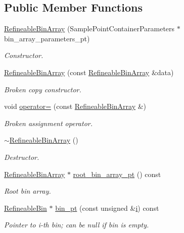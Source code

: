 \subsection*{Public Member Functions}
\begin{DoxyCompactItemize}
\item 
\hyperlink{classRefineableBinArray_ae8f20e18970ec50ea92ea975ed3b1f6e}{Refineable\+Bin\+Array} (Sample\+Point\+Container\+Parameters $\ast$bin\+\_\+array\+\_\+parameters\+\_\+pt)
\begin{DoxyCompactList}\small\item\em Constructor. \end{DoxyCompactList}\item 
\hyperlink{classRefineableBinArray_a0f9458336a724be7281174800d268073}{Refineable\+Bin\+Array} (const \hyperlink{classRefineableBinArray}{Refineable\+Bin\+Array} \&data)
\begin{DoxyCompactList}\small\item\em Broken copy constructor. \end{DoxyCompactList}\item 
void \hyperlink{classRefineableBinArray_aedf0b5374a41ba17415bee6778e07600}{operator=} (const \hyperlink{classRefineableBinArray}{Refineable\+Bin\+Array} \&)
\begin{DoxyCompactList}\small\item\em Broken assignment operator. \end{DoxyCompactList}\item 
\hyperlink{classRefineableBinArray_a0ab4375c167506d001a9522307805ab4}{$\sim$\+Refineable\+Bin\+Array} ()
\begin{DoxyCompactList}\small\item\em Destructor. \end{DoxyCompactList}\item 
\hyperlink{classRefineableBinArray}{Refineable\+Bin\+Array} $\ast$ \hyperlink{classRefineableBinArray_a827b6f05fefe24b6099044159c01ea34}{root\+\_\+bin\+\_\+array\+\_\+pt} () const
\begin{DoxyCompactList}\small\item\em Root bin array. \end{DoxyCompactList}\item 
\hyperlink{classRefineableBin}{Refineable\+Bin} $\ast$ \hyperlink{classRefineableBinArray_ad4a6e34791849b9f8349281cf416beaa}{bin\+\_\+pt} (const unsigned \&\hyperlink{cfortran_8h_adb50e893b86b3e55e751a42eab3cba82}{i}) const
\begin{DoxyCompactList}\small\item\em Pointer to i-\/th bin; can be null if bin is empty. \end{DoxyCompactList}\item 

\end{DoxyCompactItemize}
